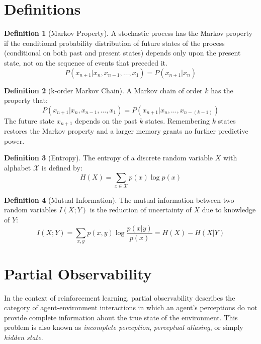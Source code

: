 \documentclass{article} %
\title{}
\author{}
\theoremstyle{definition}
\newtheorem{definition}{Definition}[section]
\begin{document}
\maketitle

\begin{abstract}

\end{abstract}

\section{Definitions}

\begin{definition}[Markov Property]
A stochastic process has the Markov property if the conditional
probability distribution of future states of the process (conditional
on both past and present states) depends only upon the present state,
not on the sequence of events that preceded it.
\[
P(x_{n+1} | x_{n}, x_{n-1}, \dots, x_{1}) = P(x_{n+1} | x_{n})
\]
\end{definition}

\begin{definition}[k-order Markov Chain]
A Markov chain of order $k$ has the property that:
\[
P(x_{n+1} | x_{n}, x_{n-1}, \dots, x_{1}) = P(x_{n+1} | x_{n}, \dots, x_{n-(k-1)})
\]
The future state $x_{n+1}$ depends on the past $k$ states. Remembering
$k$ states restores the Markov property and a larger memory grants no
further predictive power.
\end{definition}

\begin{definition}[Entropy]
The entropy of a discrete random variable $X$ with alphabet $\mathcal{X}$ is
defined by:
\[
H(X) = \sum_{x\in \mathcal{X}} p(x) \log p(x)
\]
\end{definition}

\begin{definition}[Mutual Information]
The mutual information between two random variables $I(X;Y)$ is the
reduction of uncertainty of $X$ due to knowledge of $Y$:
\[
I(X;Y) = \sum_{x,y} p(x,y) \log \frac{p(x|y)}{p(x)} = H(X) - H(X|Y)
\]
\end{definition}

\section{Partial Observability}
In the context of reinforcement learning, partial observability
describes the category of agent-environment interactions in which an
agent's perceptions do not provide complete information about the true
state of the environment. This problem is also known as
\textit{incomplete perception}, \textit{perceptual aliasing}, or
simply \textit{hidden state}.
\end{document}
